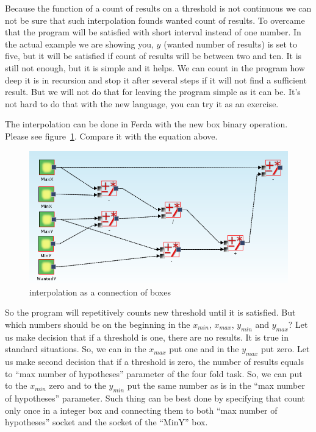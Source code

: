 \documentclass[a4paper,12pt]{book}
\begin{document}
Because the function of a count of results on a threshold is not continuous we can not be sure that such interpolation founds wanted count of results. To overcame that the program will be satisfied with short interval instead of one number. In the actual example we are showing you, $y$ (wanted number of results) is set to five, but it will be satisfied if count of results will be between two and ten. It is still not enough, but it is simple and it helps. We can count in the program how deep it is in recursion and stop it after several steps if it will not find a sufficient result. But we will not do that for leaving the program simple as it can be. It's not hard to do that with the new language, you can try it as an exercise. 

The interpolation can be done in Ferda with the new box binary operation. Please see figure~\ref{fig:linearInterpolationBoxes}. Compare it with the equation above.

\begin{figure}
	\includegraphics[width=1\textwidth]{linearInterpolation}
	\caption{interpolation as a connection of boxes}
	\label{fig:linearInterpolationBoxes}
\end{figure}

So the program will repetitively counts new threshold until it is satisfied. But which numbers should be on the beginning in the $x_{min}$, $x_{max}$, $y_{min}$ and $y_{max}$? Let us make decision that if a threshold is one, there are no results. It is true in standard situations. So, we can in the $x_{max}$ put one and in the $y_{max}$ put zero. Let us make second decision that if a threshold is zero, the number of results equals to ``max number of hypotheses'' parameter of the four fold task. So, we can put to the $x_{min}$ zero and to the $y_{min}$ put the same number as is in the ``max number of hypotheses'' parameter. Such thing can be best done by specifying that count only once in a integer box and connecting them to both ``max number of hypotheses'' socket and the socket of the ``MinY'' box.
\end{document}
